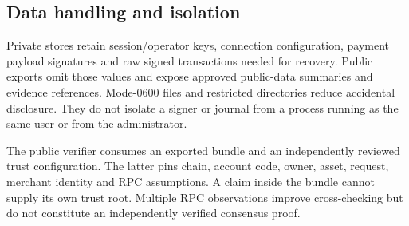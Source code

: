 \subsection{Data handling and isolation}
Private stores retain session/operator keys, connection configuration, payment payload signatures and raw signed transactions needed for recovery. Public exports omit those values and expose approved public-data summaries and evidence references. Mode-0600 files and restricted directories reduce accidental disclosure. They do not isolate a signer or journal from a process running as the same user or from the administrator.

The public verifier consumes an exported bundle and an independently reviewed trust configuration. The latter pins chain, account code, owner, asset, request, merchant identity and RPC assumptions. A claim inside the bundle cannot supply its own trust root. Multiple RPC observations improve cross-checking but do not constitute an independently verified consensus proof.
